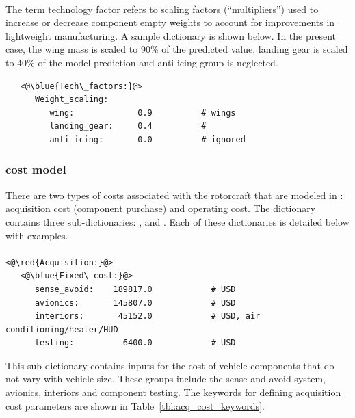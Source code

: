 \paragraph{}
The term technology factor refers to scaling factors (``multipliers'') used to increase or decrease component empty weights to account for improvements in lightweight manufacturing. A sample dictionary is shown below. In the present case, the wing mass is scaled to 90\% of the predicted value, landing gear is scaled to 40\% of the model prediction and anti-icing group is neglected.
\begin{lstlisting}
   <@\blue{Tech\_factors:}@>
      Weight_scaling:
         wing:             0.9          # wings
         landing_gear:     0.4          #  
         anti_icing:       0.0          # ignored  
\end{lstlisting}

\subsubsection{ cost model}

There are two types of costs associated with the rotorcraft that are modeled in \hydra: acquisition cost (component purchase) and operating cost. The dictionary  contains three sub-dictionaries: ,   and . Each of these dictionaries is detailed below with examples.

\paragraph{}
\begin{lstlisting}
<@\red{Acquisition:}@>
   <@\blue{Fixed\_cost:}@>
      sense_avoid:    189817.0            # USD 
      avionics:       145807.0            # USD
      interiors:       45152.0            # USD, air conditioning/heater/HUD
      testing:          6400.0            # USD 
\end{lstlisting}
This sub-dictionary contains inputs for the cost of vehicle components that do not vary with vehicle size. These groups include the sense and avoid system, avionics, interiors and component testing. The keywords for defining acquisition cost parameters are shown in Table~\ref{tbl:acq_cost_keywords}.

